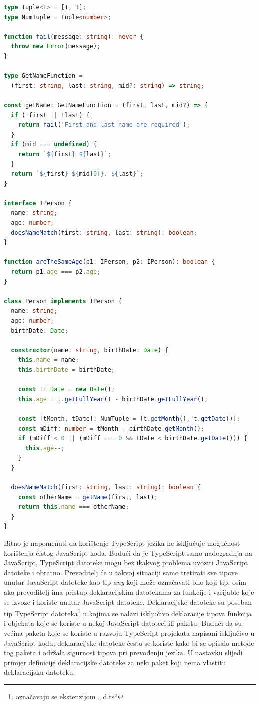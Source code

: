 \documentclass[times, utf8, diplomski, numeric]{fer}
\newcommand{\razmakp}{\vspace{18pt}}
\newcommand{\razmaks}{\vspace{10pt}}
\begin{document}
\razmakp %
\begin{lstlisting}[language=TypeScript, caption={Primjer definiranja i korištenja TypeScript tipova}, label={lst:typescript}]
type Tuple<T> = [T, T];
type NumTuple = Tuple<number>;

function fail(message: string): never {
  throw new Error(message);
}

type GetNameFunction =
  (first: string, last: string, mid?: string) => string;

const getName: GetNameFunction = (first, last, mid?) => {
  if (!first || !last) {
    return fail('First and last name are required');
  }
  if (mid === undefined) {
    return `${first} ${last}`;
  }
  return `${first} ${mid[0]}. ${last}`;
}

interface IPerson {
  name: string;
  age: number;
  doesNameMatch(first: string, last: string): boolean;
}

function areTheSameAge(p1: IPerson, p2: IPerson): boolean {
  return p1.age === p2.age;
}

class Person implements IPerson {
  name: string;
  age: number;
  birthDate: Date;

  constructor(name: string, birthDate: Date) {
    this.name = name;
    this.birthDate = birthDate;
  
    const t: Date = new Date();
    this.age = t.getFullYear() - birthDate.getFullYear();

    const [tMonth, tDate]: NumTuple = [t.getMonth(), t.getDate()];
    const mDiff: number = tMonth - birthDate.getMonth();
    if (mDiff < 0 || (mDiff === 0 && tDate < birthDate.getDate())) {
      this.age--;
    }
  }

  doesNameMatch(first: string, last: string): boolean {
    const otherName = getName(first, last);
    return this.name === otherName;
  }
}

\end{lstlisting}
\razmaks

Bitno je napomenuti da korištenje TypeScript jezika ne isključuje mogućnost korištenja čistog JavaScript koda.
Budući da je TypeScript samo nadogradnja na JavaScript, TypeScript datoteke mogu bez ikakvog problema uvoziti  JavaScript datoteke i obratno.
Prevoditelj će u takvoj situaciji samo tretirati sve tipove unutar JavaScript datoteke kao tip \emph{any} koji može označavati bilo koji tip, osim ako prevoditelj ima pristup deklaracijskim datotekama  za funkcije i varijable koje se izvoze  i koriste unutar JavaScript datoteke.
Deklaracijske datoteke su poseban tip TypeScript datoteka\footnote{označavaju se ekstenzijom „.d.ts“} u kojima se nalazi isključivo deklaracije tipova funkcija i objekata koje se koriste u nekoj JavaScript datoteci ili paketu.\citep{ts_hand}
Budući da su većina paketa koje se koriste u razvoju TypeScript projekata napisani isključivo u JavaScript kodu, deklaracijske datoteke često se koriste kako bi se opisalo metode tog paketa i održala sigurnost tipova pri prevođenju jezika.
U nastavku slijedi primjer definicije deklaracijske datoteke za neki paket koji nema vlastitu deklaracijsku datoteku.
\end{document}
